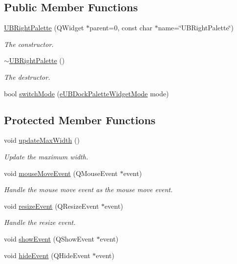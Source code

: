 \subsection*{Public Member Functions}
\begin{DoxyCompactItemize}
\item 
\hyperlink{class_u_b_right_palette_a1511f65218e83962d96b619d8a964a96}{U\-B\-Right\-Palette} (Q\-Widget $\ast$parent=0, const char $\ast$name=\char`\"{}U\-B\-Right\-Palette\char`\"{})
\begin{DoxyCompactList}\small\item\em The constructor. \end{DoxyCompactList}\item 
\hyperlink{class_u_b_right_palette_a964105922602806d1d217fecf778f7c3}{$\sim$\-U\-B\-Right\-Palette} ()
\begin{DoxyCompactList}\small\item\em The destructor. \end{DoxyCompactList}\item 
bool \hyperlink{class_u_b_right_palette_a3347b1b9346d58d1134480d192a12dd3}{switch\-Mode} (\hyperlink{_u_b_dock_palette_widget_8h_af3b2828ed1bf91ad13c73e4e1b3b529e}{e\-U\-B\-Dock\-Palette\-Widget\-Mode} mode)
\end{DoxyCompactItemize}
\subsection*{Protected Member Functions}
\begin{DoxyCompactItemize}
\item 
void \hyperlink{class_u_b_right_palette_abb19744e0b3c162256a26f061ec21332}{update\-Max\-Width} ()
\begin{DoxyCompactList}\small\item\em Update the maximum width. \end{DoxyCompactList}\item 
void \hyperlink{class_u_b_right_palette_aad705f22ac7ad958e57568fc9d316dc7}{mouse\-Move\-Event} (Q\-Mouse\-Event $\ast$event)
\begin{DoxyCompactList}\small\item\em Handle the mouse move event  as the mouse move event. \end{DoxyCompactList}\item 
void \hyperlink{class_u_b_right_palette_abe3c59eacb8e43c88a6290ecc16d9697}{resize\-Event} (Q\-Resize\-Event $\ast$event)
\begin{DoxyCompactList}\small\item\em Handle the resize event. \end{DoxyCompactList}\item 
void \hyperlink{class_u_b_right_palette_a9c82d52ad9fa99ecf5d51e9630eb4e09}{show\-Event} (Q\-Show\-Event $\ast$event)
\item 
void \hyperlink{class_u_b_right_palette_a806b0ebdada76153add26b1079f10e2f}{hide\-Event} (Q\-Hide\-Event $\ast$event)
\end{DoxyCompactItemize}
